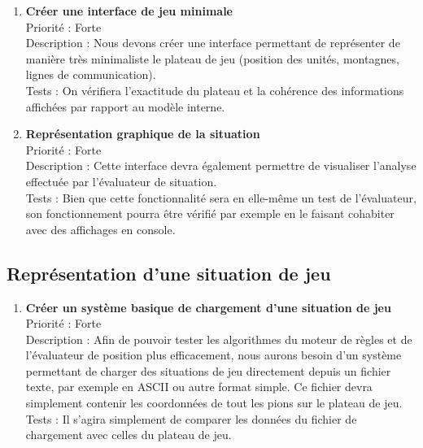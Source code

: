 \documentclass[12pt]{article}
\begin{document}
			\begin{enumerate}

				\item \textbf{Créer une interface de jeu minimale} 
				\\[0.7\baselineskip]
				Priorité : Forte 
				\\[0.7\baselineskip]
				Description : Nous devons créer une interface permettant de représenter de manière très minimaliste le plateau de jeu (position des unités, 
				montagnes, lignes de communication). 
				\\[0.7\baselineskip]
				Tests : On vérifiera l'exactitude du plateau et la cohérence des informations affichées par rapport au modèle interne. 
				\\[0.7\baselineskip]

				\item \textbf{Représentation graphique de la situation} 
				\\[0.7\baselineskip]
				Priorité : Forte 
				\\[0.7\baselineskip]
				Description : Cette interface devra également permettre de visualiser l'analyse effectuée par l'évaluateur de situation. 
				\\[0.7\baselineskip]
				Tests : Bien que cette fonctionnalité sera en elle-même un test de l'évaluateur, son fonctionnement pourra être vérifié par exemple en 
				le faisant cohabiter avec des affichages en console. 
				\\[0.7\baselineskip]

				
			\end{enumerate}

		\subsection{Représentation d'une situation de jeu}

			\begin{enumerate}

				\item \textbf{Créer un système basique de chargement d'une situation de jeu} 
				\\[0.7\baselineskip]
				Priorité : Forte 
				\\[0.7\baselineskip]
				Description : Afin de pouvoir tester les algorithmes du moteur de règles et de l'évaluateur de position plus efficacement, nous aurons besoin 
				d'un système permettant de charger des situations de jeu directement depuis un fichier texte, par exemple en ASCII ou autre format simple. 
				Ce fichier devra simplement contenir les coordonnées de tout les pions sur le plateau de jeu. 
				\\[0.7\baselineskip]
				Tests : Il s'agira simplement de comparer les données du fichier de chargement avec celles du plateau de jeu. 
				\\[0.7\baselineskip]
				
			\end{enumerate}
\end{document}
